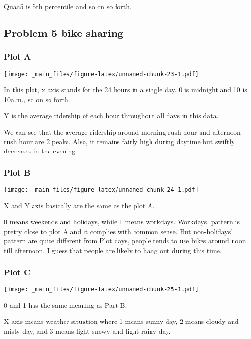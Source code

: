 \documentclass[
]{article}
\begin{document}
Quan5 is 5th percentile and so on so forth.

\hypertarget{problem-5-bike-sharing}{%
\subsection{Problem 5 bike sharing}\label{problem-5-bike-sharing}}

\hypertarget{plot-a}{%
\subsubsection{Plot A}\label{plot-a}}

\texttt{[image: \_main\_files/figure-latex/unnamed-chunk-23-1.pdf]}

In this plot, x axis stands for the 24 hours in a single day. 0 is midnight and 10 is 10a.m., so on so forth.

Y is the average ridership of each hour throughout all days in this data.

We can see that the average ridership around morning rush hour and afternoon rush hour are 2 peaks. Also, it remains fairly high during daytime but swiftly decreases in the evening.

\hypertarget{plot-b}{%
\subsubsection{Plot B}\label{plot-b}}

\texttt{[image: \_main\_files/figure-latex/unnamed-chunk-24-1.pdf]}

X and Y axis basically are the same as the plot A.

0 means weekends and holidays, while 1 means workdays. Workdays' pattern is pretty close to plot A and it complies with common sense. But non-holidays' pattern are quite different from Plot days, people tends to use bikes around noon till afternoon. I guess that people are likely to hang out during this time.

\hypertarget{plot-c}{%
\subsubsection{Plot C}\label{plot-c}}

\texttt{[image: \_main\_files/figure-latex/unnamed-chunk-25-1.pdf]}

0 and 1 has the same meaning as Part B.

X axis means weather situation where 1 means sunny day, 2 means cloudy and misty day, and 3 means light snowy and light rainy day.
\end{document}
